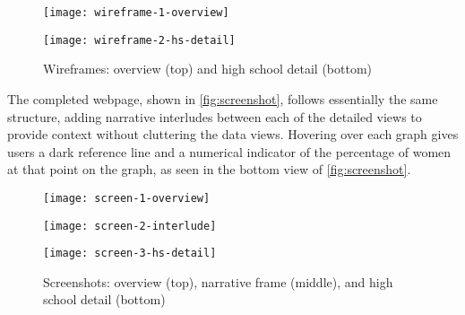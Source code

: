 \begin{figure}
  \texttt{[image: wireframe-1-overview]}

  \vspace{2cm}

  \texttt{[image: wireframe-2-hs-detail]}
  \caption{Wireframes: overview (top) and high school detail (bottom)}\label{fig:wireframe}
\end{figure}

The completed webpage, shown in \autoref{fig:screenshot}, follows essentially the same structure, adding narrative interludes between each of the detailed views to provide context without cluttering the data views. Hovering over each graph gives users a dark reference line and a numerical indicator of the percentage of women at that point on the graph, as seen in the bottom view of \autoref{fig:screenshot}.

\begin{figure}
  \texttt{[image: screen-1-overview]}


  \texttt{[image: screen-2-interlude]}


  \texttt{[image: screen-3-hs-detail]}
  \caption{Screenshots: overview (top), narrative frame (middle), and high school detail (bottom)}\label{fig:screenshot}
\end{figure}

